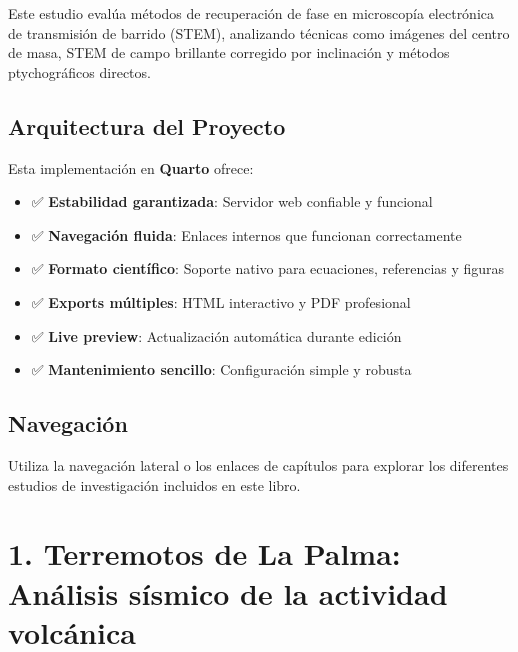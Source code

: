 \documentclass[
  letterpaper,
]{book}
\providecommand{\tightlist}{%
  \setlength{\itemsep}{0pt}\setlength{\parskip}{0pt}}
\begin{document}

Este estudio evalúa métodos de recuperación de fase en microscopía
electrónica de transmisión de barrido (STEM), analizando técnicas como
imágenes del centro de masa, STEM de campo brillante corregido por
inclinación y métodos ptychográficos directos.

\section*{Arquitectura del Proyecto}\label{arquitectura-del-proyecto}


Esta implementación en \textbf{Quarto} ofrece:

\begin{itemize}
\tightlist
\item
  ✅ \textbf{Estabilidad garantizada}: Servidor web confiable y
  funcional
\item
  ✅ \textbf{Navegación fluida}: Enlaces internos que funcionan
  correctamente
\item
  ✅ \textbf{Formato científico}: Soporte nativo para ecuaciones,
  referencias y figuras
\item
  ✅ \textbf{Exports múltiples}: HTML interactivo y PDF profesional
\item
  ✅ \textbf{Live preview}: Actualización automática durante edición
\item
  ✅ \textbf{Mantenimiento sencillo}: Configuración simple y robusta
\end{itemize}

\section*{Navegación}\label{navegaciuxf3n}


Utiliza la navegación lateral o los enlaces de capítulos para explorar
los diferentes estudios de investigación incluidos en este libro.


\chapter{1. Terremotos de La Palma: Análisis sísmico de la actividad
volcánica}\label{terremotos-de-la-palma-anuxe1lisis-suxedsmico-de-la-actividad-volcuxe1nica}
\end{document}
